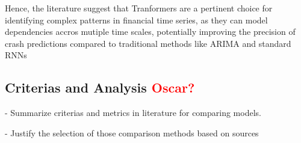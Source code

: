 \documentclass[12pt, letterpaper]{article}
\begin{document}
Hence, the literature suggest that Tranformers are a pertinent choice for identifying complex patterns in financial time series, as they can model dependencies accros mutiple time scales, potentially improving the precision of crash predictions compared to traditional methods like ARIMA and standard RNNs



\subsection*{Criterias and Analysis \textcolor{red}{Oscar?}}
- Summarize criterias and metrics in literature for comparing models.

- Justify the selection of those comparison methods based on sources

\pagebreak
\printbibliography

\end{document}
